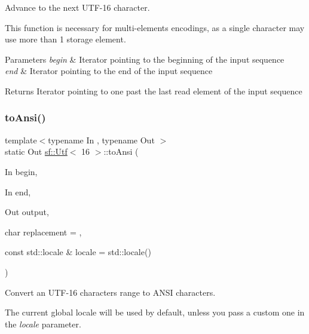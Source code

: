 Advance to the next U\+T\+F-\/16 character. 

This function is necessary for multi-\/elements encodings, as a single character may use more than 1 storage element.


\begin{DoxyParams}{Parameters}
{\em begin} & Iterator pointing to the beginning of the input sequence \\
\hline
{\em end} & Iterator pointing to the end of the input sequence\\
\hline
\end{DoxyParams}
\begin{DoxyReturn}{Returns}
Iterator pointing to one past the last read element of the input sequence 
\end{DoxyReturn}
\mbox{\label{classsf_1_1_utf_3_0116_01_4_a6d2bfbdfe46364bd49bca28a410b18f7}} 
\subsubsection{\texorpdfstring{to\+Ansi()}{toAnsi()}}
{\footnotesize\ttfamily template$<$typename In , typename Out $>$ \\
static Out \hyperlink{classsf_1_1_utf}{sf\+::\+Utf}$<$ 16 $>$\+::to\+Ansi (\begin{DoxyParamCaption}\item[{In}]{begin,  }\item[{In}]{end,  }\item[{Out}]{output,  }\item[{char}]{replacement = {},  }\item[{const std\+::locale \&}]{locale = {\ttfamily std\+:\+:locale()} }\end{DoxyParamCaption})\hspace{0.3cm}{\ttfamily [static]}}



Convert an U\+T\+F-\/16 characters range to A\+N\+SI characters. 

The current global locale will be used by default, unless you pass a custom one in the {\itshape locale} parameter.


